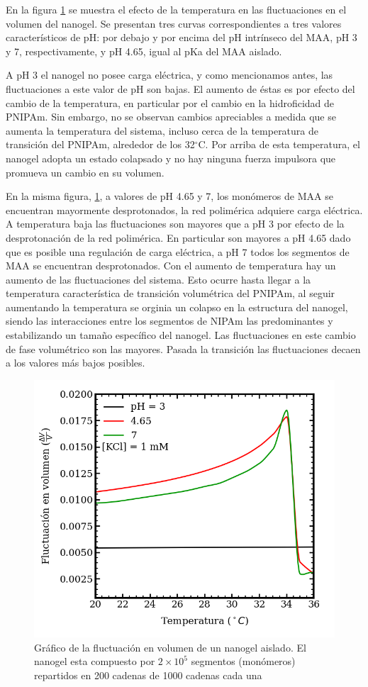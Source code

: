 	
	En la figura \ref{fig:mc:fluct-T} se muestra el efecto de la temperatura en las fluctuaciones en el volumen del nanogel. Se presentan tres curvas correspondientes a tres valores caracter\'isticos de pH: por debajo y por encima del pH intr\'inseco del MAA, pH 3 y 7, respectivamente, y pH 4.65, igual al pKa del MAA aislado.
	
	A pH 3 el nanogel no posee carga el\'ectrica, y como mencionamos antes, las fluctuaciones a este valor de pH son bajas. El aumento de \'estas es por efecto del cambio de la temperatura, en particular por el cambio en la hidroficidad de PNIPAm. Sin embargo, no se observan cambios apreciables a medida que se aumenta la temperatura del sistema, incluso cerca de la temperatura de transici\'on del PNIPAm, alrededor de los 32$^\circ$C. Por arriba de esta temperatura, el nanogel adopta un estado colapsado y no hay ninguna fuerza impulsora que promueva un cambio en su volumen.
	
	En la misma figura, \ref{fig:mc:fluct-T}, a valores de pH 4.65 y 7, los mon\'omeros de MAA se encuentran mayormente desprotonados, la red polim\'erica adquiere carga el\'ectrica. 
	A temperatura baja las fluctuaciones son mayores que a pH 3 por efecto de la desprotonaci\'on de la red polim\'erica. En particular son mayores a pH 4.65 dado que es posible una regulaci\'on de carga el\'ectrica, a pH 7 todos los segmentos de MAA se encuentran desprotonados.
	Con el aumento de temperatura hay un aumento de las fluctuaciones del sistema.
	Esto ocurre hasta llegar a la temperatura caracter\'istica de transici\'on volum\'etrica del PNIPAm, al seguir aumentando la temperatura se orginia un colapso en la estructura del nanogel, siendo las interacciones entre los segmentos de NIPAm las predominantes y estabilizando un tama\~no espec\'ifico del nanogel.
	Las fluctuaciones en este cambio de fase volum\'etrico son las mayores. Pasada la transici\'on las fluctuaciones decaen a los valores m\'as bajos posibles.
	
	
	
	\begin{figure}
		\centering
		\includegraphics[width=0.45\linewidth]{Figures/graph-mc/fluct-T.png}
		\caption{Gr\'afico de la fluctuaci\'on en volumen de un nanogel aislado. El nanogel esta compuesto por $2\times 10^5$ segmentos (mon\'omeros) repartidos en 200 cadenas de 1000 cadenas cada una}
		\label{fig:mc:fluct-T}
	\end{figure}
	
